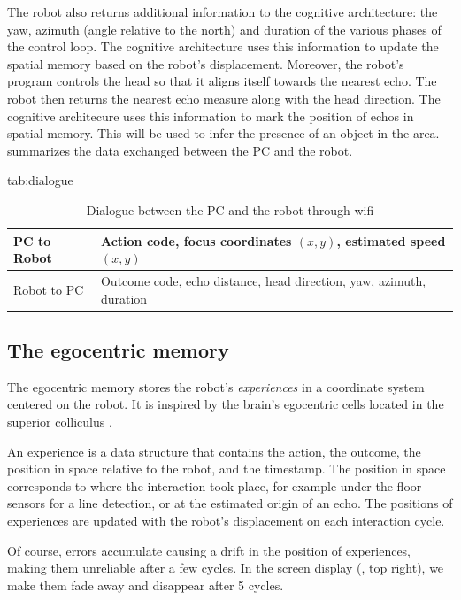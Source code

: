 \documentclass[pmlr]{jmlr}%
\begin{document}
The robot also returns additional information to the cognitive architecture: the yaw, azimuth (angle relative to the north) and duration of the various phases of the control loop. 
The cognitive architecture uses this information to update the spatial memory based on the robot's displacement. 
Moreover, the robot's program controls the head so that it aligns itself towards the nearest echo. 
The robot then returns the nearest echo measure along with the head direction. 
The cognitive architecure uses this information to mark the position of echos in spatial memory. 
This will be used to infer the presence of an object in the area. 
 summarizes the data exchanged between the PC and the robot.

\begin{table}[htbp]
	\floatconts
	{tab:dialogue}%
	{\caption{Dialogue between the PC and the robot through wifi}}%
	{\begin{tabular}{l|l}
			\toprule
			PC to Robot & Action code, focus coordinates $(x, y)$, estimated speed $(x, y)$\\
			\midrule
			Robot to PC & Outcome code, echo distance, head direction, yaw, azimuth, duration\\
			\bottomrule
	\end{tabular}}
\end{table}

\subsection{The egocentric memory}

The egocentric memory stores the robot's \textit{experiences} in a coordinate system centered on the robot.
It is inspired by the brain's egocentric cells located in the superior colliculus \citep{grieves_representation_2017}.

An experience is a data structure that contains the action, the outcome, the position in space relative to the robot, and the timestamp. 
The position in space corresponds to where the interaction took place, for example under the floor sensors for a line detection, or at the estimated origin of an echo. 
The positions of experiences are updated with the robot's displacement on each interaction cycle. 

Of course, errors accumulate causing a drift in the position of experiences, making them unreliable after a few cycles. 
In the screen display (, top right), we make them fade away and disappear after 5 cycles.  
\end{document}

